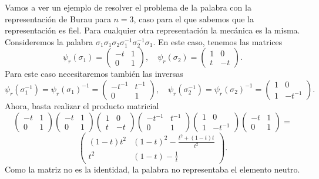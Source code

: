 \documentclass[TFG.tex]{subfiles}
\begin{document}
\begin{ej}
Vamos a ver un ejemplo de resolver el problema de la palabra con la representación de Burau para $n=3$, caso para el que sabemos que la representación es fiel. Para cualquier otra representación la mecánica es la misma. Consideremos la palabra $\sigma_1\sigma_1\sigma_2\sigma_1^{-1}\sigma_2^{-1}\sigma_1$. En este caso, tenemos las matrices
\[
\psi_r(\sigma_1)=\begin{pmatrix}
-t&1 \\
0 & 1
\end{pmatrix},\quad \psi_r(\sigma_2)=\begin{pmatrix}
1&0 \\
t&-t
\end{pmatrix}.
\]
Para este caso necesitaremos también las inversas
\[
\psi_r(\sigma_1^{-1})=\psi_r(\sigma_1)^{-1}=\begin{pmatrix}
-t^{-1}&t^{-1} \\
0&1
\end{pmatrix},\quad \psi_r(\sigma_2^{-1})=\psi_r(\sigma_2)^{-1}=\begin{pmatrix}
1&0 \\
1&-t^{-1}
\end{pmatrix}.
\]
Ahora, basta realizar el producto matricial
\[
\begin{pmatrix}
-t&1 \\
0 & 1
\end{pmatrix}
\begin{pmatrix}
-t&1 \\
0 & 1
\end{pmatrix}\begin{pmatrix}
1&0 \\
t&-t
\end{pmatrix}\begin{pmatrix}
-t^{-1}&t^{-1} \\
0&1
\end{pmatrix}\begin{pmatrix}
1&0 \\
1&-t^{-1}
\end{pmatrix}\begin{pmatrix}
-t&1 \\
0 & 1
\end{pmatrix}=
\]
\[
\begin{pmatrix}
(1-t)t^2& (1-t)^2-\frac{t^2+(1-t)t}{t^2}\\
t^2& (1-t)-\frac{1}{t}
\end{pmatrix}.
\]
Como la matriz no es la identidad, la palabra no representaba el elemento neutro.
\end{ej}
\end{document}
